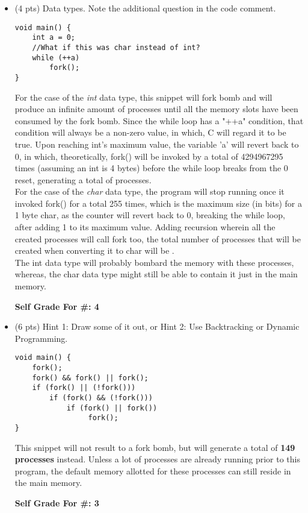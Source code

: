 \documentclass[conference]{IEEEtran}
\begin{document}
\begin{itemize}
	\item (4 pts) Data types. Note the additional question in the code comment.
\begin{lstlisting}
void main() {
    int a = 0; 
    //What if this was char instead of int?
    while (++a)
        fork();
}
\end{lstlisting}
For the case of the \textit{int} data type, this snippet will fork bomb and will produce an infinite amount of processes until all the memory slots have been consumed by the fork bomb. Since the while loop has a "++a" condition, that condition will always be a non-zero value, in which, C will regard it to be true. Upon reaching int's maximum value, the variable 'a' will revert back to 0, in which, theoretically, fork() will be invoked by a total of 4294967295 times (assuming an int is 4 bytes) before the while loop breaks from the 0 reset, generating a total of  processes. \\
For the case of the \textit{char} data type, the program will stop running once it invoked fork() for a total 255 times, which is the maximum size (in bits) for a 1 byte char, as the counter will revert back to 0, breaking the while loop, after adding 1 to its maximum value. Adding recursion wherein all the created processes will call fork too, the total number of processes that will be created when converting it to char will be .\\
The int data type will probably bombard the memory with these processes, whereas, the char data type might still be able to contain it just in the main memory.
\begin{center}
	\textbf{Self Grade For \#: 4}
\end{center}
\end{itemize}
\begin{itemize}
\item (6 pts) Hint 1: Draw some of it out, or Hint 2: Use Backtracking or Dynamic Programming.
\begin{lstlisting}
void main() {
    fork();
    fork() && fork() || fork();
    if (fork() || (!fork()))
        if (fork() && (!fork()))
            if (fork() || fork())
                 fork();
}
\end{lstlisting}
This snippet will not result to a fork bomb, but will generate a total of \textbf{149 processes} instead. Unless a lot of processes are already running prior to this program, the default memory allotted for these processes can still reside in the main memory.
\begin{center}
	\textbf{Self Grade For \#: 3}
\end{center}
\end{itemize}
\end{document}
